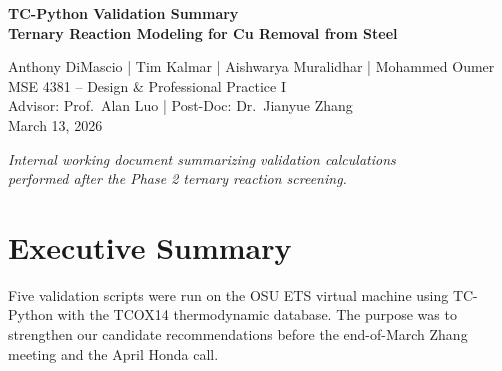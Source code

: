 \documentclass[11pt]{article}
\begin{document}
\thispagestyle{fancy}
\vspace*{\fill}

\begin{center}
{\LARGE\bfseries TC-Python Validation Summary\\[0.5em]
\large Ternary Reaction Modeling for Cu Removal from Steel\par}
\end{center}

\vspace{1in}

\begin{center}
{\large
Anthony DiMascio | Tim Kalmar | Aishwarya Muralidhar | Mohammed Oumer\\[1em]
MSE 4381 -- Design \& Professional Practice I\\
Advisor: Prof.\ Alan Luo | Post-Doc: Dr.\ Jianyue Zhang\\[0.5em]
March 13, 2026\par}
\end{center}

\vspace{1in}

\begin{center}
\textit{Internal working document summarizing validation calculations\\
performed after the Phase 2 ternary reaction screening.}
\end{center}

\vspace*{\fill}
\newpage

\tableofcontents
\newpage

\section{Executive Summary}

Five validation scripts were run on the OSU ETS virtual machine using TC-Python with the TCOX14 thermodynamic database. The purpose was to strengthen our candidate recommendations before the end-of-March Zhang meeting and the April Honda call.
\end{document}
